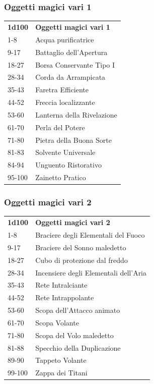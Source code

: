 \begin{multicols}{2}
	\subsubsection{Oggetti magici vari 1}

	\begin{tabularx}{0.45\textwidth}{lX}
		\textbf{1d100} & \textbf{Oggetti magici vari 1}\\
		1-8& Acqua purificatrice\\
		9-17&Battaglio dell'Apertura\\
		18-27&Borsa Conservante Tipo I\\
		28-34& Corda da Arrampicata\\
		35-43&Faretra Efficiente\\
		44-52&Freccia localizzante\\
		53-60&Lanterna della Rivelazione\\
		61-70&Perla del Potere\\
		71-80&Pietra della Buona Sorte\\
		81-83&Solvente Universale\\
		84-94&Unguento Ristorativo\\
		95-100&Zainetto Pratico\\
	\end{tabularx}

	\subsubsection{Oggetti magici vari 2}


	\begin{tabularx}{0.45\textwidth}{lX}
		\textbf{1d100} & \textbf{Oggetti magici vari 2}\\
		1-8 &Braciere degli Elementali del Fuoco\\
		9-17 &Braciere del Sonno maledetto\\
		18-27& Cubo di protezione dal freddo\\
		28-34& Incensiere degli Elementali dell'Aria\\
		35-43& Rete Intralciante\\
		44-52& Rete Intrappolante\\
		53-60& Scopa dell’Attacco animato\\
		61-70& Scopa Volante\\
		71-80& Scopa del Volo maledetto\\
		81-88& Specchio della Duplicazione\\
		89-90& Tappeto Volante\\
		99-100& Zappa dei Titani\\
	\end{tabularx}


\end{multicols}
